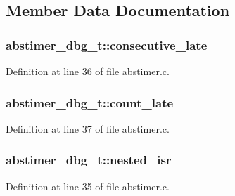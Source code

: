 \subsection{Member Data Documentation}
\subsubsection[{\texorpdfstring{consecutive\+\_\+late}{consecutive_late}}]{ abstimer\+\_\+dbg\+\_\+t\+::consecutive\+\_\+late}\hypertarget{structabstimer__dbg__t_a36c6f4adfad45443c71dfe5d2600a246}{}\label{structabstimer__dbg__t_a36c6f4adfad45443c71dfe5d2600a246}


Definition at line 36 of file abstimer.\+c.

\subsubsection[{\texorpdfstring{count\+\_\+late}{count_late}}]{ abstimer\+\_\+dbg\+\_\+t\+::count\+\_\+late}\hypertarget{structabstimer__dbg__t_aaff028d3e53cb25b7c66e071f47e9047}{}\label{structabstimer__dbg__t_aaff028d3e53cb25b7c66e071f47e9047}


Definition at line 37 of file abstimer.\+c.

\subsubsection[{\texorpdfstring{nested\+\_\+isr}{nested_isr}}]{ abstimer\+\_\+dbg\+\_\+t\+::nested\+\_\+isr}\hypertarget{structabstimer__dbg__t_a4902ccb8295dc60e5368a02ec6a39acc}{}\label{structabstimer__dbg__t_a4902ccb8295dc60e5368a02ec6a39acc}


Definition at line 35 of file abstimer.\+c.

